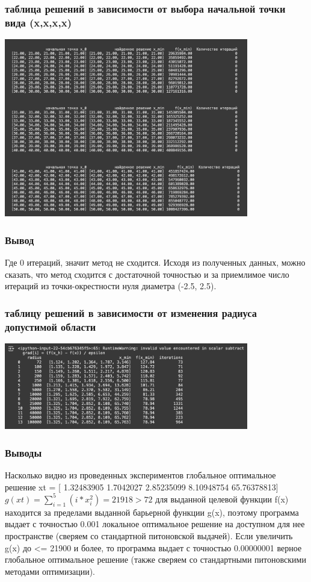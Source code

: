 \documentclass[12pt,pdf,hyperref={unicode}]{beamer}
\begin{document}
\begin{frame}
\frametitle{таблица решений в зависимости от выбора начальной точки вида (x,x,x,x)}
\begin{center}
    \includegraphics[width=0.8\textwidth]{xxx3.png}
\end{center}

\end{frame}

\begin{frame}
\frametitle{Вывод}
Где 0 итераций, значит метод не сходится. Исходя из полученных данных, можно сказать, что метод сходится с достаточной точностью и за приемлимое число итераций из точки-окрестности нуля диаметра (-2.5, 2.5).

\end{frame}

\begin{frame}
\frametitle{таблицу решений в зависимости от изменения радиуса допустимой области}
\begin{center}
    \includegraphics[width=0.8\textwidth]{radius.png}
\end{center}

\end{frame}

\begin{frame}
\frametitle{Выводы}
Насколько видно из проведенных экспериментов глобальное оптимальное решение xt = [ 1.32483905  1.7042027   2.85235099  8.10948754 65.76378813]
$g(xt) = \sum_{i=1}^5(i*x_i^2) = 21918 > 72$
для выданной целевой функции f(x) находится за пределами выданной барьерной функции g(x), поэтому программа выдает с точностью 0.001 локальное оптимальное решение на доступном для нее пространстве (сверяем со стандартной питоновской выдачей). Если увеличить g(x) до <= 21900 и более, то программа выдает с точностью 0.00000001 верное глобальное оптимальное решение (также сверяем со стандартными питоновскими методами оптимизации). 
\end{frame}
\end{document}

